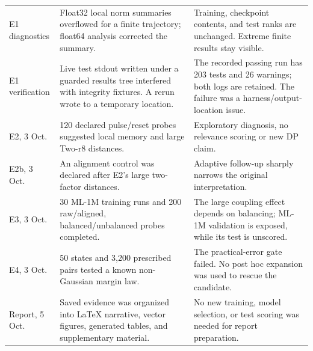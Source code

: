 \begin{longtable}{L{.17\linewidth}L{.36\linewidth}L{.36\linewidth}}
E1 diagnostics & Float32 local norm summaries overflowed for a finite
trajectory; float64 analysis corrected the summary. & Training, checkpoint
contents, and test ranks are unchanged. Extreme finite results stay visible. \\
E1 verification & Live test stdout written under a guarded results tree
interfered with integrity fixtures. A rerun wrote to a temporary location. & The
recorded passing run has 203 tests and 26 warnings; both logs are retained.
The failure was a harness/output-location issue. \\
E2, 3 Oct. & 120 declared pulse/reset probes suggested local memory and large
Two-r8 distances. & Exploratory diagnosis, no relevance scoring or new DP claim. \\
E2b, 3 Oct. & An alignment control was declared after E2's large two-factor
distances. & Adaptive follow-up sharply narrows the original interpretation. \\
E3, 3 Oct. & 30 ML-1M training runs and 200 raw/aligned, balanced/unbalanced
probes completed. & The large coupling effect depends on balancing; ML-1M
validation is exposed, while its test is unscored. \\
E4, 3 Oct. & 50 states and 3,200 prescribed pairs tested a known
non-Gaussian margin law. & The practical-error gate failed. No post hoc
expansion was used to rescue the candidate. \\
Report, 5 Oct. & Saved evidence was organized into LaTeX narrative, vector
figures, generated tables, and supplementary material. & No new training,
model selection, or test scoring was needed for report preparation. \\
\bottomrule
\end{longtable}

